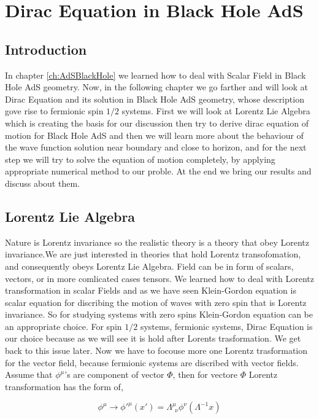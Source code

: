 \chapter{Dirac Equation in Black Hole AdS}
\label{ch:DiracAdSBlackHole}

\section{Introduction}

In chapter \ref{ch:AdSBlackHole} we learned how to deal with Scalar Field in Black Hole AdS geometry. Now, in the following chapter we go farther and will look at Dirac Equation and its solution in Black Hole AdS geometry, whose description gove rise to fermionic spin $1/2$ systems. First we will look at Lorentz Lie Algebra which is creating the basis for our discussion then try to derive dirac equation of motion for Black Hole AdS and then we will learn more about the behaviour of the wave function solution near boundary and close to horizon, and for the next step we will try to solve the equation of motion completely, by applying appropriate numerical method to our proble. At the end we bring our results and discuss about them.\\

\section{Lorentz Lie Algebra} \label{sec:LorentzLieAlgebra}
Nature is Lorentz invariance so the realistic theory is a theory that obey Lorentz invariance.We are just interested in theories that hold Lorentz transofomation, and consequently obeys Lorentz Lie Algebra. Field can be in form of scalars, vectors, or in more comlicated cases tensors. We learned how to deal with Lorentz transformation in scalar Fields and as we have seen Klein-Gordon equation is scalar equation for discribing the motion of waves with zero spin that is Lorentz invariance. So for studying systems with zero spins Klein-Gordon equation can be an appropriate choice. For spin $1/2$ systems, fermionic systems, Dirac Equation is our choice because as we will see it is hold after Lorents trasformation. We get back to this issue later. Now we have to focouse more one Lorentz trasformation for the vector field, because fermionic systems are discribed with vector fields. Assume that $\phi^{\mu}$'s are component of vector $\Phi$, then for vectore $\Phi$ Lorentz transformation has the form of,

\begin{equation}
   \phi^{\mu} \rightarrow \phi'^{\mu}(x') = \Lambda^{\mu}_{~~\nu} \phi^{\nu}(\Lambda^{-1}x)
\end{equation}      


